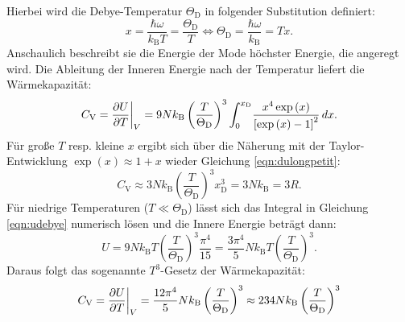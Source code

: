 Hierbei wird die Debye-Temperatur $\Theta_{\text{D}}$ in folgender Substitution definiert:
\begin{equation*}
	x = \frac{\hbar \omega}{k_{\text{B}} T} = \frac{\Theta_{\text{D}}}{T} \Leftrightarrow  \Theta_{\text{D}} = \frac{\hbar \omega}{k_{\text{B}}} = T x.
\end{equation*}
Anschaulich beschreibt sie die Energie der Mode höchster Energie, die angeregt wird.
Die Ableitung der Inneren Energie nach der Temperatur liefert die Wärmekapazität:
\begin{equation}
	C_{\text{V}} = \frac{\partial U}{\partial T} \bigg{\vert}_{V} = 9 N k_{\text{B}} \left( \frac{T}{\Theta_{\text{D}}} \right)^3 \int_{0}^{x_{\text{D}}} \! \frac{ x^4 \exp{(x)}}{ \left[ \exp{ (x) } - 1  \right]^2}  \, dx. \label{eqn:debeye}
\end{equation}
Für große $T$ resp. kleine $x$ ergibt sich über die Näherung mit der Taylor-Entwicklung $\exp(x) \approx 1 + x $ wieder Gleichung \eqref{eqn:dulongpetit}:
\begin{equation*}
	C_{\text{V}} \approx 3 N k_{\text{B}} \left( \frac{T}{\Theta_{\text{D}}} \right)^3 x_{\text{D}}^3= 3 N k_{\text{B}} = 3 R.
\end{equation*}
Für niedrige Temperaturen ($T \ll \Theta_{\text{D}}$) lässt sich das Integral in Gleichung \eqref{eqn:udebye} numerisch lösen und die Innere Energie beträgt dann:
\begin{equation*}
	U = 9 N k_{\text{B}} T \left( \frac{T}{\Theta_{\text{D}}} \right)^3 \frac{\pi^4}{15} = \frac{3 \pi^4}{5} N k_{\text{B}} T \left( \frac{T}{\Theta_{\text{D}}} \right)^3.
\end{equation*}
Daraus folgt das sogenannte $T^3$-Gesetz der Wärmekapazität:
\begin{equation*}
	C_{\text{V}} = \frac{\partial U}{\partial T} \bigg{\vert}_{V} = \frac{12 \pi^4}{5} N k_{\text{B}} \left( \frac{T}{\Theta_{\text{D}}} \right)^3 \approx 234 N k_{\text{B}} \left( \frac{T}{\Theta_{\text{D}}} \right)^3
\end{equation*}

\FloatBarrier
